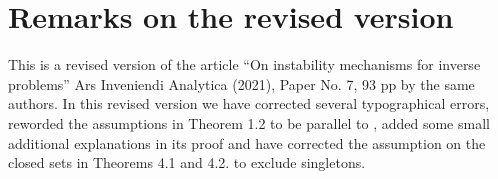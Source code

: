 \documentclass[12pt,twoside]{amsart}
\numberwithin{equation}{section}
\begin{document}
\section*{Remarks on the revised version}
This is a revised version of the article ``On instability mechanisms for inverse problems'' Ars Inveniendi Analytica (2021), Paper No. 7, 93 pp by the same authors. In this revised version we have corrected several typographical errors, reworded the assumptions in Theorem 1.2 to be parallel to \cite{Mandache}, added some small additional explanations in its proof and have corrected the assumption on the closed sets in Theorems 4.1 and 4.2. to exclude singletons.




\end{document}
